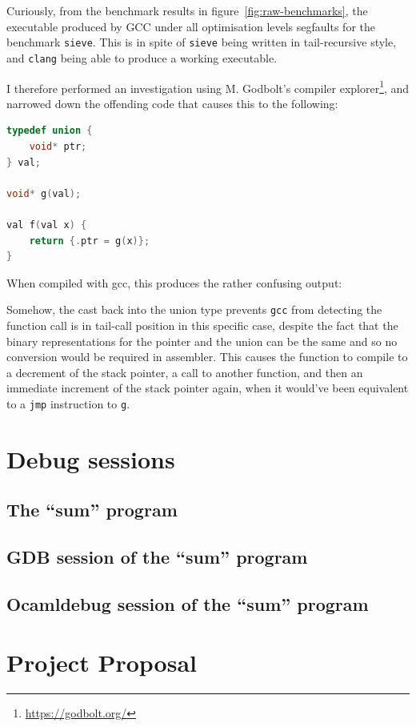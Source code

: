 Curiously, from the benchmark results in figure~\ref{fig:raw-benchmarks}, the
executable produced by GCC under all optimisation levels segfaults for the
benchmark \texttt{sieve}. This is in spite of \texttt{sieve} being written in
tail-recursive style, and \texttt{clang} being able to produce a working
executable.

I therefore performed an investigation using M. Godbolt's compiler
explorer\footnote{\url{https://godbolt.org/}}, and narrowed down the offending
code that causes this to the following: 

\begin{lstlisting}[language=C]
typedef union {
    void* ptr;
} val;

void* g(val);

val f(val x) {
    return {.ptr = g(x)};
}
\end{lstlisting}

When compiled with gcc, this produces the rather confusing output:



Somehow, the cast back into the union type prevents \texttt{gcc} from detecting 
the function call is in tail-call position in this specific case, despite the 
fact that the binary representations for the pointer and the union can be the
same and so no conversion would be required in assembler. This causes the
function to compile to a decrement of the stack pointer, a call to another
function, and then an immediate increment of the stack pointer again, when it
would've been equivalent to a \texttt{jmp} instruction to \texttt{g}.


\chapter{Debug sessions} \label{debug-sessions}

\section{The ``sum'' program}



\section{GDB session of the ``sum'' program} \label{debug-gdb}



\section{Ocamldebug session of the ``sum'' program} \label{debug-ocaml}



\chapter{Project Proposal}


